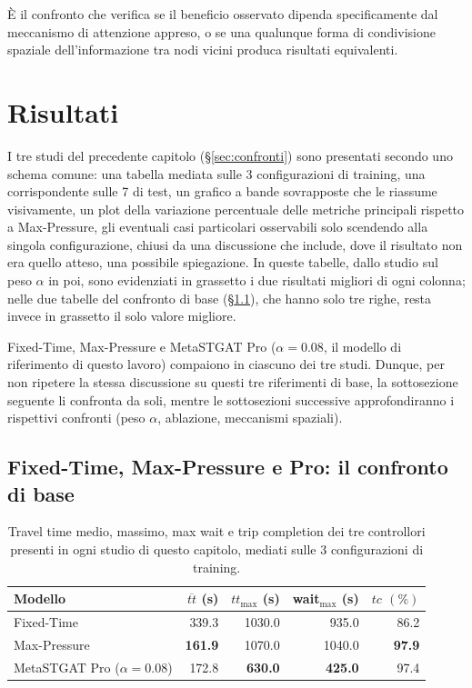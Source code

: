 È il confronto che verifica se il beneficio osservato dipenda
specificamente dal meccanismo di attenzione appreso, o se una qualunque
forma di condivisione spaziale dell'informazione tra nodi vicini produca
risultati equivalenti.

\section{Risultati}
\label{sec:risultati-baseline}

I tre studi del precedente capitolo (§\ref{sec:confronti}) sono presentati
secondo uno schema comune: una tabella mediata sulle 3 configurazioni di
training, una corrispondente sulle 7 di test, un grafico a bande sovrapposte che le
riassume visivamente, un plot della variazione percentuale delle metriche principali rispetto a
Max-Pressure, gli eventuali casi particolari osservabili solo scendendo
alla singola configurazione, chiusi da una discussione che include, dove il risultato non
era quello atteso, una possibile spiegazione.
In queste tabelle, dallo studio sul peso $\alpha$ in poi, sono evidenziati
in grassetto i due risultati migliori di ogni colonna; nelle due tabelle
del confronto di base (§\ref{sec:risultati-base}), che hanno solo tre
righe, resta invece in grassetto il solo valore migliore.

Fixed-Time, Max-Pressure e MetaSTGAT Pro ($\alpha=0.08$, il modello di
riferimento di questo lavoro) compaiono in ciascuno dei tre studi.
Dunque, per non ripetere la stessa discussione su questi tre riferimenti di base,
la sottosezione seguente li confronta da soli,
mentre le sottosezioni successive approfondiranno i rispettivi confronti
(peso $\alpha$, ablazione, meccanismi spaziali).

\subsection{Fixed-Time, Max-Pressure e Pro: il confronto di base}
\label{sec:risultati-base}

\begin{table}[htbp]
  \centering
  \begin{tabular}{@{}lrrrr@{}}
    \toprule
    Modello                       & $\overline{tt}$ (s) & $tt_{\max}$ (s) & wait$_{\max}$ (s) & $tc$ $(\%)$   \\
    \midrule
    Fixed-Time                    & 339.3               & 1030.0          & 935.0             & 86.2          \\
    Max-Pressure                  & \textbf{161.9}      & 1070.0          & 1040.0            & \textbf{97.9} \\
    MetaSTGAT Pro ($\alpha=0.08$) & 172.8               & \textbf{630.0}  & \textbf{425.0}    & 97.4          \\
    \bottomrule
  \end{tabular}
  \caption{Travel time medio, massimo, max wait e trip completion dei tre
    controllori presenti in ogni studio di questo capitolo, mediati sulle 3
    configurazioni di training.}
  \label{tab:base-train}
\end{table}

